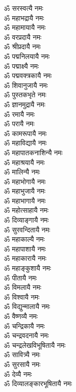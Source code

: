 \begin{multicols}{2}
\begin{flushleft}
ॐ सरस्वत्यै नमः\\
ॐ महाभद्रायै नमः\\
ॐ महामायायै नमः\\
ॐ वरप्रदायै नमः\\
ॐ श्रीप्रदायै नमः\\
ॐ पद्मनिलयायै नमः\\
ॐ पद्माक्ष्यै नमः\\
ॐ पद्मवक्त्रकायै नमः\\
ॐ शिवानुजायै नमः\\
ॐ पुस्तकभृते नमः\hfill{}\\
ॐ ज्ञानमुद्रायै नमः\\
ॐ रमायै नमः\\
ॐ परायै नमः\\
ॐ कामरूपायै नमः\\
ॐ महाविद्यायै नमः\\
ॐ महापातकनाशिन्यै नमः\\
ॐ महाश्रयायै नमः\\
ॐ मालिन्यै नमः\\
ॐ महाभोगायै नमः\\
ॐ महाभुजायै नमः\hfill{}\\
ॐ महाभागायै नमः\\
ॐ महोत्साहायै नमः\\
ॐ दिव्याङ्गायै नमः\\
ॐ सुरवन्दितायै नमः\\
ॐ महाकाल्यै नमः\\
ॐ महापाशायै नमः\\
ॐ महाकारायै नमः\\
ॐ महाङ्कुशायै नमः\\
ॐ पीतायै नमः\\
ॐ विमलायै नमः\hfill{}\\
ॐ विश्वायै नमः\\
ॐ विद्युन्मालायै नमः\\
ॐ वैष्णव्यै नमः\\
ॐ चन्द्रिकायै नमः\\
ॐ चन्द्रवदनायै नमः\\
ॐ चन्द्रलेखविभूषितायै नमः\\
ॐ सावित्र्यै नमः\\
ॐ सुरसायै नमः\\
ॐ देव्यै नमः\\
ॐ दिव्यालङ्कारभूषितायै नमः\hfill{}\\

\end{flushleft}
\end{multicols}
